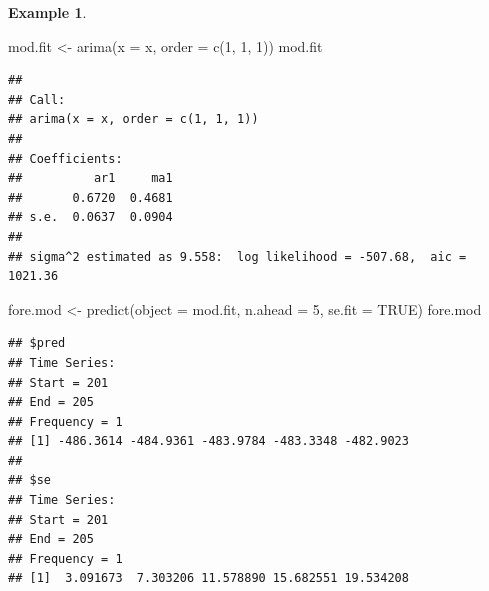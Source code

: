 \documentclass[
]{book}
\newenvironment{Shaded}{\begin{snugshade}}{\end{snugshade}}
\newcommand{\AttributeTok}[1]{\textcolor[rgb]{0.77,0.63,0.00}{#1}}
\newcommand{\CommentTok}[1]{\textcolor[rgb]{0.56,0.35,0.01}{\textit{#1}}}
\newcommand{\ConstantTok}[1]{\textcolor[rgb]{0.00,0.00,0.00}{#1}}
\newcommand{\DecValTok}[1]{\textcolor[rgb]{0.00,0.00,0.81}{#1}}
\newcommand{\FloatTok}[1]{\textcolor[rgb]{0.00,0.00,0.81}{#1}}
\newcommand{\FunctionTok}[1]{\textcolor[rgb]{0.00,0.00,0.00}{#1}}
\newcommand{\NormalTok}[1]{#1}
\newcommand{\OtherTok}[1]{\textcolor[rgb]{0.56,0.35,0.01}{#1}}
\newcommand{\SpecialCharTok}[1]{\textcolor[rgb]{0.00,0.00,0.00}{#1}}
\theoremstyle{definition}
\theoremstyle{definition}
\newtheorem{example}{Example}[chapter]
\theoremstyle{definition}
\theoremstyle{definition}
\theoremstyle{remark}
\begin{document}
\begin{example}
\begin{Shaded}
\end{Shaded}

\begin{Shaded}
\begin{Highlighting}[]
\NormalTok{mod.fit }\OtherTok{\textless{}{-}} \FunctionTok{arima}\NormalTok{(}\AttributeTok{x =}\NormalTok{ x, }\AttributeTok{order =} \FunctionTok{c}\NormalTok{(}\DecValTok{1}\NormalTok{, }\DecValTok{1}\NormalTok{, }\DecValTok{1}\NormalTok{))}
\NormalTok{mod.fit}
\end{Highlighting}
\end{Shaded}

\begin{verbatim}
## 
## Call:
## arima(x = x, order = c(1, 1, 1))
## 
## Coefficients:
##          ar1     ma1
##       0.6720  0.4681
## s.e.  0.0637  0.0904
## 
## sigma^2 estimated as 9.558:  log likelihood = -507.68,  aic = 1021.36
\end{verbatim}

\begin{Shaded}
\begin{Highlighting}[]
\NormalTok{fore.mod }\OtherTok{\textless{}{-}} \FunctionTok{predict}\NormalTok{(}\AttributeTok{object =}\NormalTok{ mod.fit, }\AttributeTok{n.ahead =} \DecValTok{5}\NormalTok{, se.fit  }
    \OtherTok{=} \ConstantTok{TRUE}\NormalTok{) }
\NormalTok{fore.mod}
\end{Highlighting}
\end{Shaded}

\begin{verbatim}
## $pred
## Time Series:
## Start = 201 
## End = 205 
## Frequency = 1 
## [1] -486.3614 -484.9361 -483.9784 -483.3348 -482.9023
## 
## $se
## Time Series:
## Start = 201 
## End = 205 
## Frequency = 1 
## [1]  3.091673  7.303206 11.578890 15.682551 19.534208
\end{verbatim}

\begin{Shaded}
\end{Shaded}
\end{example}
\end{document}
